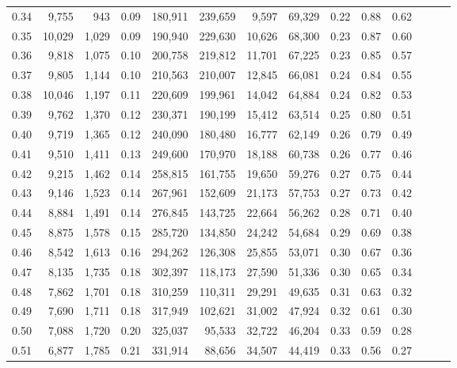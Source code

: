 \begin{tabular}{rrrrrrrrrrrrrr}
0.34 &   9,755 &    943 &  0.09 &  180,911 &  239,659 &   9,597 &  69,329 &  0.22 &  0.88 &      0.62 \\
0.35 &  10,029 &  1,029 &  0.09 &  190,940 &  229,630 &  10,626 &  68,300 &  0.23 &  0.87 &      0.60 \\
0.36 &   9,818 &  1,075 &  0.10 &  200,758 &  219,812 &  11,701 &  67,225 &  0.23 &  0.85 &      0.57 \\
0.37 &   9,805 &  1,144 &  0.10 &  210,563 &  210,007 &  12,845 &  66,081 &  0.24 &  0.84 &      0.55 \\
0.38 &  10,046 &  1,197 &  0.11 &  220,609 &  199,961 &  14,042 &  64,884 &  0.24 &  0.82 &      0.53 \\
0.39 &   9,762 &  1,370 &  0.12 &  230,371 &  190,199 &  15,412 &  63,514 &  0.25 &  0.80 &      0.51 \\
0.40 &   9,719 &  1,365 &  0.12 &  240,090 &  180,480 &  16,777 &  62,149 &  0.26 &  0.79 &      0.49 \\
0.41 &   9,510 &  1,411 &  0.13 &  249,600 &  170,970 &  18,188 &  60,738 &  0.26 &  0.77 &      0.46 \\
0.42 &   9,215 &  1,462 &  0.14 &  258,815 &  161,755 &  19,650 &  59,276 &  0.27 &  0.75 &      0.44 \\
0.43 &   9,146 &  1,523 &  0.14 &  267,961 &  152,609 &  21,173 &  57,753 &  0.27 &  0.73 &      0.42 \\
0.44 &   8,884 &  1,491 &  0.14 &  276,845 &  143,725 &  22,664 &  56,262 &  0.28 &  0.71 &      0.40 \\
0.45 &   8,875 &  1,578 &  0.15 &  285,720 &  134,850 &  24,242 &  54,684 &  0.29 &  0.69 &      0.38 \\
0.46 &   8,542 &  1,613 &  0.16 &  294,262 &  126,308 &  25,855 &  53,071 &  0.30 &  0.67 &      0.36 \\
0.47 &   8,135 &  1,735 &  0.18 &  302,397 &  118,173 &  27,590 &  51,336 &  0.30 &  0.65 &      0.34 \\
0.48 &   7,862 &  1,701 &  0.18 &  310,259 &  110,311 &  29,291 &  49,635 &  0.31 &  0.63 &      0.32 \\
0.49 &   7,690 &  1,711 &  0.18 &  317,949 &  102,621 &  31,002 &  47,924 &  0.32 &  0.61 &      0.30 \\
0.50 &   7,088 &  1,720 &  0.20 &  325,037 &   95,533 &  32,722 &  46,204 &  0.33 &  0.59 &      0.28 \\
0.51 &   6,877 &  1,785 &  0.21 &  331,914 &   88,656 &  34,507 &  44,419 &  0.33 &  0.56 &      0.27 \\

\end{tabular}
